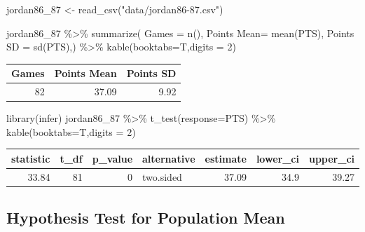 \documentclass[
  11pt,
]{book}
\newenvironment{Shaded}{\begin{snugshade}}{\end{snugshade}}
\newcommand{\AttributeTok}[1]{\textcolor[rgb]{0.77,0.63,0.00}{#1}}
\newcommand{\DecValTok}[1]{\textcolor[rgb]{0.00,0.00,0.81}{#1}}
\newcommand{\FunctionTok}[1]{\textcolor[rgb]{0.00,0.00,0.00}{#1}}
\newcommand{\NormalTok}[1]{#1}
\newcommand{\OtherTok}[1]{\textcolor[rgb]{0.56,0.35,0.01}{#1}}
\newcommand{\SpecialCharTok}[1]{\textcolor[rgb]{0.00,0.00,0.00}{#1}}
\newcommand{\StringTok}[1]{\textcolor[rgb]{0.31,0.60,0.02}{#1}}
\theoremstyle{definition}
\theoremstyle{definition}
\theoremstyle{definition}
\theoremstyle{definition}
\theoremstyle{remark}
\begin{document}
\vfill

\newpage

\begin{Shaded}
\begin{Highlighting}[]
\NormalTok{jordan86\_87 }\OtherTok{\textless{}{-}} \FunctionTok{read\_csv}\NormalTok{(}\StringTok{"data/jordan86{-}87.csv"}\NormalTok{)}

\NormalTok{jordan86\_87 }\SpecialCharTok{\%\textgreater{}\%} \FunctionTok{summarize}\NormalTok{(}
  \AttributeTok{Games =} \FunctionTok{n}\NormalTok{(), }
  \StringTok{\textasciigrave{}}\AttributeTok{Points Mean}\StringTok{\textasciigrave{}}\OtherTok{=} \FunctionTok{mean}\NormalTok{(PTS),}
  \StringTok{\textasciigrave{}}\AttributeTok{Points SD}\StringTok{\textasciigrave{}} \OtherTok{=} \FunctionTok{sd}\NormalTok{(PTS),) }\SpecialCharTok{\%\textgreater{}\%} 
  \FunctionTok{kable}\NormalTok{(}\AttributeTok{booktabs=}\NormalTok{T,}\AttributeTok{digits =} \DecValTok{2}\NormalTok{)}
\end{Highlighting}
\end{Shaded}

\begin{tabular}{rrr}
\toprule
Games & Points Mean & Points SD\\
\midrule
82 & 37.09 & 9.92\\
\bottomrule
\end{tabular}
\bigskip

\begin{Shaded}
\begin{Highlighting}[]
\FunctionTok{library}\NormalTok{(infer)}
\NormalTok{jordan86\_87 }\SpecialCharTok{\%\textgreater{}\%} \FunctionTok{t\_test}\NormalTok{(}\AttributeTok{response=}\NormalTok{PTS) }\SpecialCharTok{\%\textgreater{}\%} 
  \FunctionTok{kable}\NormalTok{(}\AttributeTok{booktabs=}\NormalTok{T,}\AttributeTok{digits =} \DecValTok{2}\NormalTok{)}
\end{Highlighting}
\end{Shaded}

\begin{tabular}{rrrlrrr}
\toprule
statistic & t\_df & p\_value & alternative & estimate & lower\_ci & upper\_ci\\
\midrule
33.84 & 81 & 0 & two.sided & 37.09 & 34.9 & 39.27\\
\bottomrule
\end{tabular}
\newpage

\hypertarget{hypothesis-test-for-population-mean}{%
\subsection{Hypothesis Test for Population Mean}\label{hypothesis-test-for-population-mean}}
\end{document}
